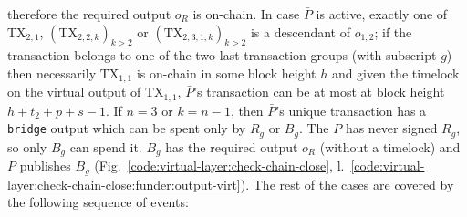   therefore the required output $o_R$ is on-chain. In
  case $\bar{P}$ is active, exactly one of $\mathrm{TX}_{2, 1}$,
  $(\mathrm{TX}_{2, 2, k})_{k > 2}$ or $(\mathrm{TX}_{2, 3, 1, k})_{k > 2}$ is a
  descendant of $o_{1, 2}$; if the transaction belongs to one of the two last
  transaction groups (with subscript $g$) then necessarily $\mathrm{TX}_{1, 1}$ is on-chain in some
  block height $h$ and given the timelock on the virtual output of
  $\mathrm{TX}_{1, 1}$, $\bar{P}$'s transaction can be at most at block height
  $h + t_2 + p + s - 1$. If $n=3$ or $k=n-1$, then $\bar{P}$'s unique
  transaction has a \texttt{bridge} output which can be spent only by $R_g$ or
  $B_g$. The $P$ has never signed $R_g$, so only $B_g$ can spend it. $B_g$ has
  the required output $o_R$ (without a timelock) and $P$ publishes $B_g$
  (Fig.~\ref{code:virtual-layer:check-chain-close},
  l.~\ref{code:virtual-layer:check-chain-close:funder:output-virt}). The rest of
  the cases are covered by the following sequence of events:

